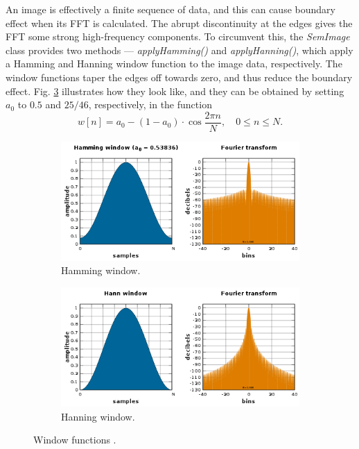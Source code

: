 \documentclass[conference]{IEEEtran}
\begin{document}
An image is effectively a finite sequence of data, and this can cause boundary effect when its FFT is calculated. The abrupt discontinuity at the edges gives the FFT some strong high-frequency components. To circumvent this, the \textit{SemImage} class provides two methods --- \textit{applyHamming()} and \textit{applyHanning()}, which apply a Hamming and Hanning window function to the image data, respectively. The window functions taper the edges off towards zero, and thus reduce the boundary effect. Fig. \ref{Window functions} illustrates how they look like, and they can be obtained by setting $a_0$ to $0.5$ and $25/46$, respectively, in the function
\begin{equation}
    w[n] = a_0 - (1-a_0)\cdot \cos{\frac{2\pi n}{N}}, \quad 0\leq n \leq N.
\end{equation}

\begin{figure}[htbp]
    \centering
    \begin{subfigure}{0.45\textwidth}
        \centering
        \includegraphics[width=1\textwidth]{Images/Window Hamming.png}
        \caption{Hamming window.}
        \label{Window Hamming}
    \end{subfigure}
    \begin{subfigure}{0.45\textwidth}
        \centering
        \includegraphics[width=1\textwidth]{Images/Window Hanning.png}
        \caption{Hanning window.}
        \label{Window Hanning}
    \end{subfigure}
    \caption{Window functions \cite{Window function wiki}.}
    \label{Window functions}
\end{figure}
\end{document}
